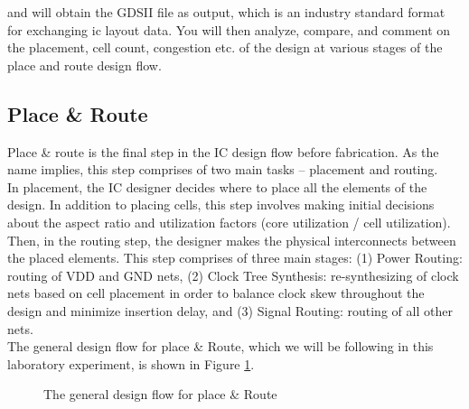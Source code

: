 \documentclass[a4paper,11pt]{article}%
\begin{document}
and will obtain the GDSII file as output, which is an industry standard format for exchanging \ac{ic} layout data. You will then analyze, compare, and comment on the placement, cell count, congestion etc. of the design at various stages of the place and route design flow.

\subsection{Place \& Route}

Place \& route is the final step in the IC design flow before fabrication. As the name implies, this step comprises of two main tasks – placement and routing.\\

In placement, the IC designer decides where to place all the elements of the design. In addition to placing cells, this step involves making initial decisions about the aspect ratio and utilization factors (core utilization / cell utilization).\\

Then, in the routing step, the designer makes the physical interconnects between the placed elements. This step comprises of three main stages: (1) Power Routing: routing of VDD and GND nets, (2) Clock Tree Synthesis: re-synthesizing of clock nets based on cell placement in order to balance clock skew throughout the design and minimize insertion delay, and (3) Signal Routing: routing of all other nets.\\

\pagebreak
The general design flow for place \& Route, which we will be following in this laboratory experiment, is shown in Figure \ref{fig:flow}.

\begin{figure}[h]
	\centering
	\caption{The general design flow for place \& Route}
	\label{fig:flow}
\end{figure}
\end{document}
